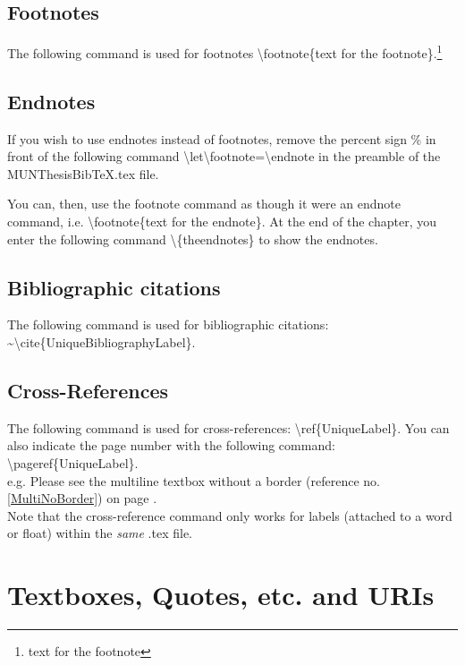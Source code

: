 \documentclass[12pt]{MUNThesisBibTeX}
\begin{document}
\subsection{Footnotes}
The following command is used for footnotes \textbackslash footnote\{text for the footnote\}.\footnote{text for the footnote}

\subsection{Endnotes}
If you wish to use endnotes instead of footnotes, remove the percent sign \% in front of the following command \textbackslash let\textbackslash footnote=\textbackslash endnote in the preamble of the MUNThesisBibTeX.tex file.

You can, then, use the footnote command as though it were an endnote command, i.e. \textbackslash footnote\{text for the endnote\}. At the end of the chapter, you enter the following command \textbackslash \{theendnotes\} to show the endnotes.


\subsection{Bibliographic citations}

The following command is used for bibliographic citations: \~{}\textbackslash cite\{UniqueBibliographyLabel\}.\cite{lshort}

\subsection{Cross-References}

The following command is used for cross-references: \textbackslash ref\{UniqueLabel\}. You can also indicate the page number with the following command: \textbackslash pageref\{UniqueLabel\}.\\

e.g. Please see the multiline textbox without a border (reference no. \ref{MultiNoBorder}) on page \pageref{MultiNoBorder}.\\

Note that the cross-reference command only works for labels (attached to a word or float) within the \emph{same} .tex file.

\section{Textboxes, Quotes, etc. and URIs}
\end{document}
